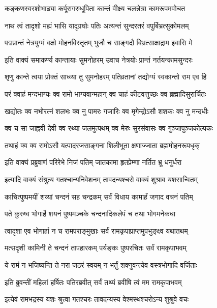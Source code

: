 \twolineshloka
{कङ्कणस्वरशोभाढ्या कर्पूरागरुधूपिता}
{कान्तं वीक्ष्य चलन्नेत्रा कामरूपमवोचत}%

\twolineshloka
{नाथ त्वं तादृशो मह्यं भासि यादृग्रघोः पतिः}
{अत्यन्तं सुन्दरतरं वपुर्बिभ्रत्सुकोमलम्}%

\twolineshloka
{पद्मप्रान्तं नेत्रयुग्मं वक्षो मोहनविस्तृतम्}
{भुजौ च साङ्गदौ बिभ्रत्साक्षाद्राम इवासि मे}%

\twolineshloka
{इति वाक्यं समाकर्ण्य कान्तायाः सुमनोहरम्}
{उवाच नेत्रयोः प्रान्तं नर्तयन्कामसुन्दरः}%

\twolineshloka
{शृणु कान्ते त्वया प्रोक्तं साध्व्या तु सुमनोहरम्}
{पतिव्रतानां तद्योग्यं स्वकान्तो राम एव हि}%

\twolineshloka
{परं क्वाहं मन्दभाग्यः क्व रामो भाग्यवान्महान्}
{क्व चाहं कीटवत्तुच्छः क्व ब्रह्मादिसुरार्चितः}%

\twolineshloka
{खद्योतः क्व नभोरत्नं शलभः क्व नु पामरः}
{गजारिः क्व मृगेन्द्रोऽसौ शशकः क्व नु मन्दधीः}%

\twolineshloka
{क्व च सा जाह्नवी देवी क्व रथ्या जलमुत्पथम्}
{क्व मेरुः सुरसंवासः क्व गुञ्जापुञ्जकोल्पकः}%

\twolineshloka
{तथाहं क्व क्व रामोऽसौ यत्पादरजसाङ्गना}
{शिलीभूता क्षणाज्जाता ब्रह्ममोहनरूपधृक्}%

\twolineshloka
{इति वाक्यं प्रब्रुवाणं परिरेभे निजं पतिम्}
{जातकामा हृतप्रेम्णा नर्तित भ्रू धनुर्धरा}%

\twolineshloka
{इत्यादि वाक्यं संश्रुत्य गतश्चान्यनिवेशनम्}
{तावदन्यश्चरो वाक्यं शुश्राव यशसान्वितम्}%

\twolineshloka
{काचित्पुष्पमयीं शय्यां चन्दनं सह चन्द्रकम्}
{सर्वं विधाय कामार्हं जगाद वचनं पतिम्}%

\twolineshloka
{पते कुरुष्व भोगार्हे शयनं पुष्पमञ्चके}
{चन्दनादिकलेपं च तथा भोगमनेकधा}%

\twolineshloka
{त्वादृशा एव भोगार्हा न च रामपराङ्मुखाः}
{सर्वं रामकृपाप्राप्तमुपभुङ्क्ष्व यथातथम्}%

\twolineshloka
{मत्सदृशी कामिनी ते चन्दनं तापहारकम्}
{पर्यङ्कः पुष्परचितः सर्वं रामकृपाभवम्}%

\twolineshloka
{ये रामं न भजिष्यन्ति ते नरा जठरं स्वयम्}
{न भर्तुं शक्नुवन्त्येव वस्त्रभोगादि वर्जिताः}%

\twolineshloka
{इति ब्रुवन्तीं महिलां हर्षितः पतिरब्रवीत्}
{सर्वं तथ्यं ब्रवीषि त्वं मम रामकृपाभवम्}%

\twolineshloka
{इत्येवं रामभद्रस्य यशः श्रुत्वा गतश्चरः}
{तावदन्यस्य वेश्मस्थश्चरोऽन्य शुश्रुवे वचः}%

